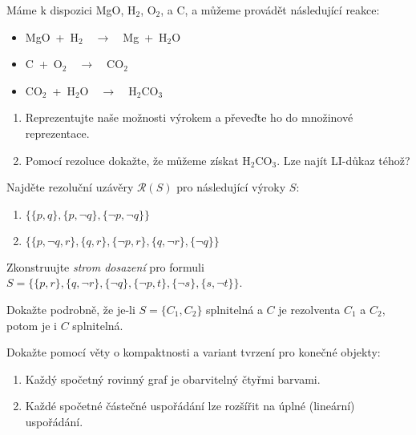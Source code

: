 \documentclass[a4paper,12pt]{article}
\begin{document}
    
    \medskip\begin{problem} Máme k dispozici MgO, H$_2$, O$_2$, a C, a můžeme provádět následující reakce:
        \begin{itemize}
            \item MgO\ +\ H$_2$\ \ $\to$\ \ Mg\ +\ H$_2$O
            \item C\ +\ O$_2$\ \ $\to$\ \ CO$_2$
            \item CO$_2$\ +\ H$_2$O\ \ $\to$\ \ H$_2$CO$_3$
        \end{itemize}
        \begin{enumerate}
            \item Reprezentujte naše možnosti výrokem %
            a převeďte ho do množinové reprezentace.
            \item Pomocí rezoluce dokažte, že můžeme získat H$_2$CO$_3$. Lze najít LI-důkaz téhož?
        \end{enumerate}
    \end{problem}
    
    
    \medskip\begin{problem}
        Najděte rezoluční uzávěry $\mathcal{R}(S)$ pro následující výroky $S$:
        \begin{enumerate}
            \item $\{\{p,q\},\{p,\neg q\},\{\neg p,\neg q\}\}$
            \item $\{\{p,\neg q,r\},\{q,r\},\{\neg p, r\},\{q,\neg r\},\{\neg q\}\}$
        \end{enumerate}
    \end{problem}
        
        
    \medskip\begin{problem}
        Zkonstruujte \emph{strom dosazení} pro formuli $S=\{\{p,r\},\{q,\neg r\},\{\neg q\},\{\neg p,t\},\{\neg s\},\{s,\neg t\}\}$.
    \end{problem}
    
    
    \medskip\begin{problem}
        Dokažte podrobně, že je-li $S=\{C_1,C_2\}$ splnitelná a $C$ je rezolventa $C_1$ a $C_2$, potom je i $C$ splnitelná.
    \end{problem}
    
        
    \medskip\begin{problem} Dokažte pomocí věty o kompaktnosti a variant tvrzení pro konečné objekty:
    \begin{enumerate}
        \item Každý spočetný rovinný graf je obarvitelný čtyřmi barvami.
        \item Každé spočetné částečné uspořádání lze rozšířit na úplné (lineární) uspořádání.
    \end{enumerate}
    
    \end{problem}
    
\end{document}
